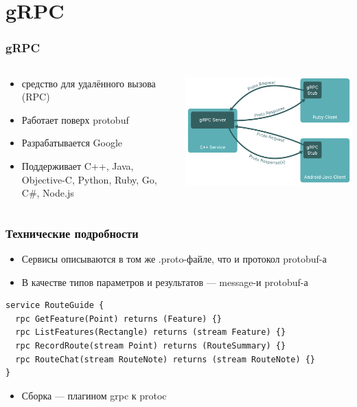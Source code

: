 \documentclass[xetex,mathserif,serif]{beamer}
\begin{document}
	\section{gRPC}

	\begin{frame}
		\frametitle{gRPC}
		\begin{columns}
			\begin{column}{0.6\textwidth}
				\begin{itemize}
					\item средство для удалённого вызова (RPC)
					\item Работает поверх protobuf
					\item Разрабатывается Google
					\item Поддерживает C++, Java, Objective-C, Python, Ruby, Go, C\#, Node.js
				\end{itemize}
			\end{column}
			\begin{column}{0.4\textwidth}
				\begin{center}
					\includegraphics[width=\textwidth]{grpc.png}
				\end{center}
			\end{column}
		\end{columns}
	\end{frame}

	\begin{frame}[fragile]
		\frametitle{Технические подробности}
		\begin{itemize}
			\item Сервисы описываются в том же .proto-файле, что и протокол protobuf-а
			\item В качестве типов параметров и результатов --- message-и protobuf-а
		\end{itemize}
		\begin{verbatim}
service RouteGuide {
  rpc GetFeature(Point) returns (Feature) {}
  rpc ListFeatures(Rectangle) returns (stream Feature) {}
  rpc RecordRoute(stream Point) returns (RouteSummary) {}
  rpc RouteChat(stream RouteNote) returns (stream RouteNote) {}
}
		\end{verbatim}
		\begin{itemize}
			\item Сборка --- плагином grpc к protoc
		\end{itemize}
\end{frame}
\end{document}
